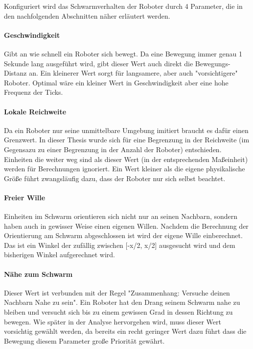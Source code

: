 Konfiguriert wird das Schwarmverhalten der Roboter durch 4 Parameter, die in den nachfolgenden Abschnitten näher erläutert werden.

\paragraph*{Geschwindigkeit} Gibt an wie schnell ein Roboter sich bewegt. Da eine Bewegung immer genau 1 Sekunde lang ausgeführt wird, gibt dieser Wert auch direkt die Bewegungs-Distanz an. Ein kleinerer Wert sorgt für langsamere, aber auch "vorsichtigere" Roboter. Optimal wäre ein kleiner Wert in Geschwindigkeit aber eine hohe Frequenz der Ticks.

\paragraph*{Lokale Reichweite} Da ein Roboter nur seine unmittelbare Umgebung imitiert braucht es dafür einen Grenzwert. In dieser Thesis wurde sich für eine Begrenzung in der Reichweite (im Gegensazu zu einer Begrenzung in der Anzahl der Roboter) entschieden. Einheiten die weiter weg sind als dieser Wert (in der entsprechenden Maßeinheit) werden für Berechnungen ignoriert. Ein Wert kleiner als die eigene physikalische Größe führt zwangsläufig dazu, dass der Roboter nur sich selbst beachtet.

\paragraph*{Freier Wille} Einheiten im Schwarm orientieren sich nicht nur an seinen Nachbarn, sondern haben auch in gewisser Weise einen eigenen Willen. Nachdem die Berechnung der Orientierung am Schwarm abgeschlossen ist wird der eigene Wille einberechnet. Das ist ein Winkel der zufällig zwischen [-x/2, x/2] ausgesucht wird und dem bisherigen Winkel aufgerechnet wird.

\paragraph*{Nähe zum Schwarm} Dieser Wert ist verbunden mit der Regel "Zusammenhang: Versuche deinen Nachbarn Nahe zu sein". Ein Roboter hat den Drang seinem Schwarm nahe zu bleiben und versucht sich bis zu einem gewissen Grad in dessen Richtung zu bewegen. Wie später in der Analyse hervorgehen wird, muss dieser Wert vorsichtig gewählt werden, da bereits ein recht geringer Wert dazu führt dass die Bewegung diesem Parameter große Priorität gewährt.\\

